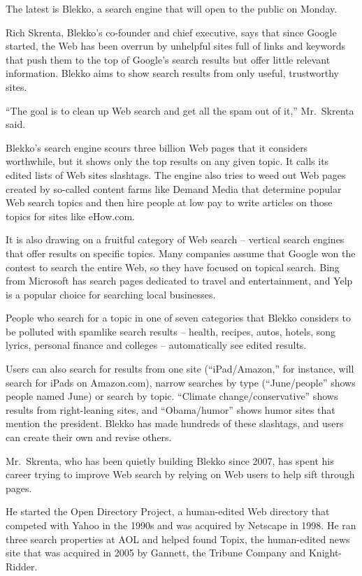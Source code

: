 ﻿\documentclass[12pt]{article}
\begin{document}
The latest is Blekko, a search engine that will open to the public on Monday.

Rich Skrenta, Blekko's co-founder and chief executive, says that since Google started, the Web has
been overrun by unhelpful sites full of links and keywords that push them to the top of Google's
search results but offer little relevant information. Blekko aims to show search results from only
useful, trustworthy sites.

``The goal is to clean up Web search and get all the spam out of it,'' Mr.~Skrenta said.

Blekko's search engine scours three billion Web pages that it considers worthwhile, but it shows
only the top results on any given topic. It calls its edited lists of Web sites slashtags. The
engine also tries to weed out Web pages created by so-called content farms like Demand Media that
determine popular Web search topics and then hire people at low pay to write articles on those
topics for sites like eHow.com.

It is also drawing on a fruitful category of Web search -- vertical search engines that offer
results on specific topics. Many companies assume that Google won the contest to search the entire
Web, so they have focused on topical search. Bing from Microsoft has search pages dedicated to
travel and entertainment, and Yelp is a popular choice for searching local businesses.

People who search for a topic in one of seven categories that Blekko considers to be polluted with
spamlike search results -- health, recipes, autos, hotels, song lyrics, personal finance and
colleges -- automatically see edited results.

Users can also search for results from one site (``iPad/Amazon,'' for instance, will search for
iPads on Amazon.com), narrow searches by type (``June/people'' shows people named June) or search by
topic. ``Climate change/conservative'' shows results from right-leaning sites, and ``Obama/humor''
shows humor sites that mention the president. Blekko has made hundreds of these slashtags, and users
can create their own and revise others.

Mr.~Skrenta, who has been quietly building Blekko since 2007, has spent his career trying to improve
Web search by relying on Web users to help sift through pages.

He started the Open Directory Project, a human-edited Web directory that competed with Yahoo in the
1990s and was acquired by Netscape in 1998. He ran three search properties at AOL and helped found
Topix, the human-edited news site that was acquired in 2005 by Gannett, the Tribune Company and
Knight-Ridder.
\end{document}
